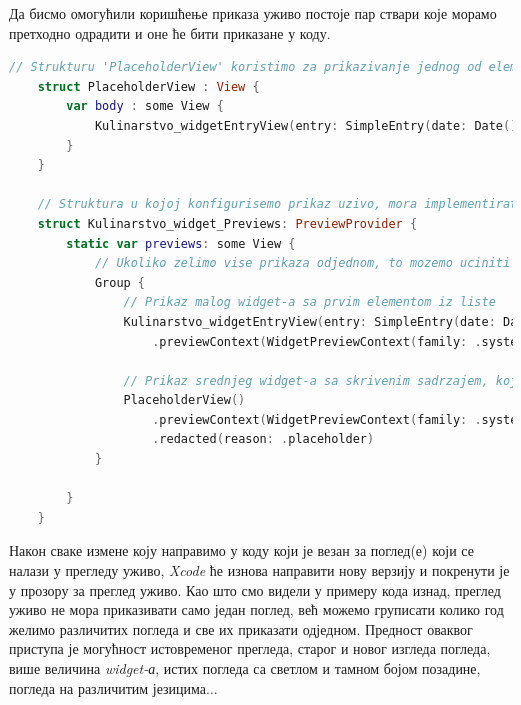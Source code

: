 \documentclass[12pt,oneside]{memoir}
\begin{document}
\indent Да бисмо омогућили коришћење приказа уживо постоје пар ствари које морамо претходно одрадити и оне ће бити приказане у коду.

\begin{lstlisting}[caption=\textit{{Xcode - преглед уживо}}, label={lst:Xcode - преглед уживо}, language=Swift, frame=single]
    // Strukturu 'PlaceholderView' koristimo za prikazivanje jednog od elemenata(u ovom slucaju prvog) iz liste u pregledu uzivo, sa podrazumevanim podacima
    struct PlaceholderView : View {
        var body : some View {
            Kulinarstvo_widgetEntryView(entry: SimpleEntry(date: Date(), configuration: ConfigurationIntent(), recipe: RecipeModel.testData[0]))
        }
    }
    
    // Struktura u kojoj konfigurisemo prikaz uzivo, mora implementirati protokol 'PreviewProvider'
    struct Kulinarstvo_widget_Previews: PreviewProvider {
        static var previews: some View {
            // Ukoliko zelimo vise prikaza odjednom, to mozemo uciniti tako sto cemo ih smestiti u jednu grupu
            Group {
                // Prikaz malog widget-a sa prvim elementom iz liste
                Kulinarstvo_widgetEntryView(entry: SimpleEntry(date: Date(), configuration: ConfigurationIntent(), recipe: RecipeModel.testData[0]))
                    .previewContext(WidgetPreviewContext(family: .systemSmall))
                
                // Prikaz srednjeg widget-a sa skrivenim sadrzajem, koji sluzi za prikaz widget-a bez konkretnog sadrzaja, na primer kako bi widget izgledao dok se podaci ucitavaju
                PlaceholderView()
                    .previewContext(WidgetPreviewContext(family: .systemMedium))
                    .redacted(reason: .placeholder)
            }
                
        }
    }    
\end{lstlisting}

\indent Након сваке измене коју направимо у коду који је везан за поглед(е) који се налази у прегледу уживо, \textit{Xcode} ће изнова направити нову верзију и покренути је у прозору за преглед уживо. Као што смо видели у примеру кода изнад, преглед уживо не мора приказивати само један поглед, већ можемо груписати колико год желимо различитих погледа и све их приказати одједном. Предност оваквог приступа је могућност истовременог прегледа, старог и новог изгледа погледа, више величина \textit{widget-а}, истих погледа са светлом и тамном бојом позадине, погледа на различитим језицима...
\end{document}
